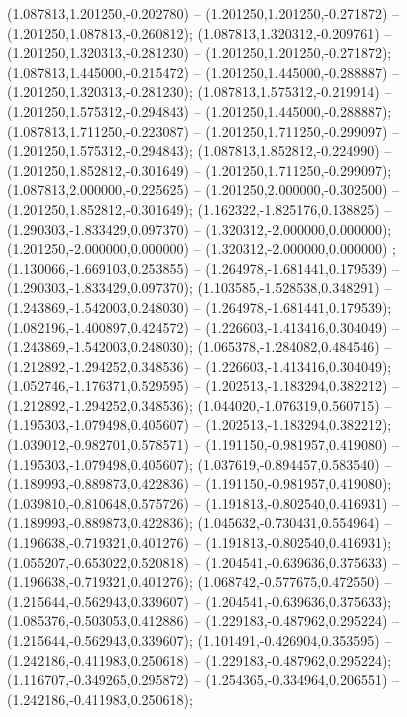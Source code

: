  (1.087813,1.201250,-0.202780) -- (1.201250,1.201250,-0.271872) -- (1.201250,1.087813,-0.260812);
 (1.087813,1.320312,-0.209761) -- (1.201250,1.320313,-0.281230) -- (1.201250,1.201250,-0.271872);
 (1.087813,1.445000,-0.215472) -- (1.201250,1.445000,-0.288887) -- (1.201250,1.320313,-0.281230);
 (1.087813,1.575312,-0.219914) -- (1.201250,1.575312,-0.294843) -- (1.201250,1.445000,-0.288887);
 (1.087813,1.711250,-0.223087) -- (1.201250,1.711250,-0.299097) -- (1.201250,1.575312,-0.294843);
 (1.087813,1.852812,-0.224990) -- (1.201250,1.852812,-0.301649) -- (1.201250,1.711250,-0.299097);
 (1.087813,2.000000,-0.225625) -- (1.201250,2.000000,-0.302500) -- (1.201250,1.852812,-0.301649);
 (1.162322,-1.825176,0.138825) -- (1.290303,-1.833429,0.097370) -- (1.320312,-2.000000,0.000000);
 (1.201250,-2.000000,0.000000) -- (1.320312,-2.000000,0.000000) ;
 (1.130066,-1.669103,0.253855) -- (1.264978,-1.681441,0.179539) -- (1.290303,-1.833429,0.097370);
 (1.103585,-1.528538,0.348291) -- (1.243869,-1.542003,0.248030) -- (1.264978,-1.681441,0.179539);
 (1.082196,-1.400897,0.424572) -- (1.226603,-1.413416,0.304049) -- (1.243869,-1.542003,0.248030);
 (1.065378,-1.284082,0.484546) -- (1.212892,-1.294252,0.348536) -- (1.226603,-1.413416,0.304049);
 (1.052746,-1.176371,0.529595) -- (1.202513,-1.183294,0.382212) -- (1.212892,-1.294252,0.348536);
 (1.044020,-1.076319,0.560715) -- (1.195303,-1.079498,0.405607) -- (1.202513,-1.183294,0.382212);
 (1.039012,-0.982701,0.578571) -- (1.191150,-0.981957,0.419080) -- (1.195303,-1.079498,0.405607);
 (1.037619,-0.894457,0.583540) -- (1.189993,-0.889873,0.422836) -- (1.191150,-0.981957,0.419080);
 (1.039810,-0.810648,0.575726) -- (1.191813,-0.802540,0.416931) -- (1.189993,-0.889873,0.422836);
 (1.045632,-0.730431,0.554964) -- (1.196638,-0.719321,0.401276) -- (1.191813,-0.802540,0.416931);
 (1.055207,-0.653022,0.520818) -- (1.204541,-0.639636,0.375633) -- (1.196638,-0.719321,0.401276);
 (1.068742,-0.577675,0.472550) -- (1.215644,-0.562943,0.339607) -- (1.204541,-0.639636,0.375633);
 (1.085376,-0.503053,0.412886) -- (1.229183,-0.487962,0.295224) -- (1.215644,-0.562943,0.339607);
 (1.101491,-0.426904,0.353595) -- (1.242186,-0.411983,0.250618) -- (1.229183,-0.487962,0.295224);
 (1.116707,-0.349265,0.295872) -- (1.254365,-0.334964,0.206551) -- (1.242186,-0.411983,0.250618);
